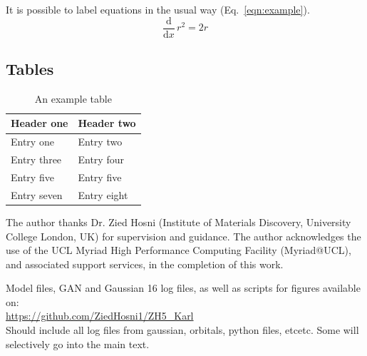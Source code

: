 \documentclass[journal=ENFL,manuscript=article]{achemso}
\begin{document}
It is possible to label equations in the usual way (Eq.~\ref{eqn:example}).
\begin{equation}
  \frac{\mathrm{d}}{\mathrm{d}x} \, r^2 = 2r \label{eqn:example}
\end{equation}

\subsection{Tables}

\begin{table}
  \caption{An example table}
  \label{tbl:example}
  \begin{tabular}{ll}
    \hline
    Header one  & Header two  \\
    \hline
    Entry one   & Entry two   \\
    Entry three & Entry four  \\
    Entry five  & Entry five  \\
    Entry seven & Entry eight \\
    \hline
  \end{tabular}
\end{table}



\begin{acknowledgement}
The author thanks Dr. Zied Hosni (Institute of Materials Discovery, University College London, UK) for supervision and guidance. The author acknowledges the use of the UCL Myriad High Performance Computing Facility (Myriad@UCL), and associated support services, in the completion of this work. 

\end{acknowledgement}

\begin{suppinfo}

Model files, GAN and Gaussian 16 log files, as well as scripts for figures available on: \\ \url{https://github.com/ZiedHosni1/ZH5_Karl}
\\ Should include all log files from gaussian, orbitals, python files, etcetc. Some will selectively go into the main text. 

\end{suppinfo}


\end{document}
